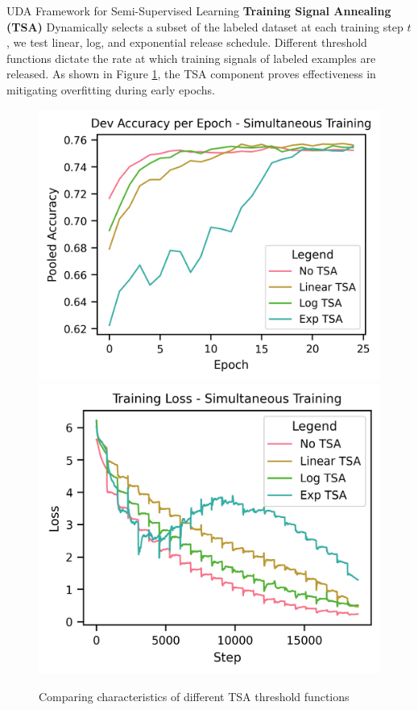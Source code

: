\documentclass[final]{beamer}
\newlength{\colwidth}
\begin{document}
\begin{frame}[t]
\begin{columns}[t]
\begin{column}{\colwidth}
\begin{block}{UDA Framework for Semi-Supervised Learning}
        \textbf{Training Signal Annealing (TSA)} Dynamically selects a subset of the labeled dataset at each training step $t$, we test linear, log, and exponential
        release schedule.
        Different threshold functions dictate the rate at which training signals of labeled examples are released.
        As shown in Figure 
        \ref{fig:tsa}, the TSA component proves effectiveness in mitigating overfitting during early epochs.
        \begin{figure}[H]%
          \centering
          \subfloat
          {{\includegraphics{pics/tsa-simul-dev.png} }}%
          \qquad
          \subfloat
          {{\includegraphics{pics/tsa-simul-loss.png} }}%
          \caption{Comparing characteristics of different TSA threshold functions}%
          \label{fig:tsa}%
        \end{figure}


\end{block}
\end{column}
\end{columns}
\end{frame}
\end{document}
